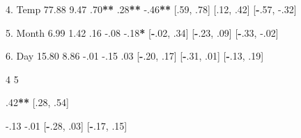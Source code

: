 \documentclass[]{article}
\newenvironment{Shaded}{\begin{snugshade}}{\end{snugshade}}
\newcommand{\DecValTok}[1]{\textcolor[rgb]{0.00,0.00,0.81}{#1}}
\newcommand{\FloatTok}[1]{\textcolor[rgb]{0.00,0.00,0.81}{#1}}
\newcommand{\NormalTok}[1]{#1}
\newcommand{\OperatorTok}[1]{\textcolor[rgb]{0.81,0.36,0.00}{\textbf{#1}}}
\newcommand{\StringTok}[1]{\textcolor[rgb]{0.31,0.60,0.02}{#1}}
\begin{document}
\begin{Shaded}
\begin{Highlighting}[]
  \FloatTok{4.}\NormalTok{ Temp    }\FloatTok{77.88}  \FloatTok{9.47}  \FloatTok{.70}\OperatorTok{**}\StringTok{        }\FloatTok{.28}\OperatorTok{**}\StringTok{       }\FloatTok{-.46}\OperatorTok{**}\StringTok{      }
\StringTok{                          }\NormalTok{[.}\DecValTok{59}\NormalTok{, }\FloatTok{.78}\NormalTok{]   [.}\DecValTok{12}\NormalTok{, }\FloatTok{.42}\NormalTok{]  [}\OperatorTok{-}\NormalTok{.}\DecValTok{57}\NormalTok{, }\FloatTok{-.32}\NormalTok{]}
                                                               
  \FloatTok{5.}\NormalTok{ Month   }\FloatTok{6.99}   \FloatTok{1.42}  \FloatTok{.16}          \FloatTok{-.08}        \FloatTok{-.18}\OperatorTok{*}\StringTok{       }
\StringTok{                          }\NormalTok{[}\OperatorTok{-}\NormalTok{.}\DecValTok{02}\NormalTok{, }\FloatTok{.34}\NormalTok{]  [}\OperatorTok{-}\NormalTok{.}\DecValTok{23}\NormalTok{, }\FloatTok{.09}\NormalTok{] [}\OperatorTok{-}\NormalTok{.}\DecValTok{33}\NormalTok{, }\FloatTok{-.02}\NormalTok{]}
                                                               
  \FloatTok{6.}\NormalTok{ Day     }\FloatTok{15.80}  \FloatTok{8.86}  \FloatTok{-.01}         \FloatTok{-.15}        \FloatTok{.03}         
\NormalTok{                          [}\OperatorTok{-}\NormalTok{.}\DecValTok{20}\NormalTok{, }\FloatTok{.17}\NormalTok{]  [}\OperatorTok{-}\NormalTok{.}\DecValTok{31}\NormalTok{, }\FloatTok{.01}\NormalTok{] [}\OperatorTok{-}\NormalTok{.}\DecValTok{13}\NormalTok{, }\FloatTok{.19}\NormalTok{] }
                                                               
  \DecValTok{4}           \DecValTok{5}          
                         
                         
                         
                         
                         
                         
                         
                         
                         
                         
                         
  \FloatTok{.42}\OperatorTok{**}\StringTok{                  }
\StringTok{  }\NormalTok{[.}\DecValTok{28}\NormalTok{, }\FloatTok{.54}\NormalTok{]             }
                         
  \FloatTok{-.13}        \FloatTok{-.01}       
\NormalTok{  [}\OperatorTok{-}\NormalTok{.}\DecValTok{28}\NormalTok{, }\FloatTok{.03}\NormalTok{] [}\OperatorTok{-}\NormalTok{.}\DecValTok{17}\NormalTok{, }\FloatTok{.15}\NormalTok{]}
                         


\end{Highlighting}
\end{Shaded}
\end{document}
